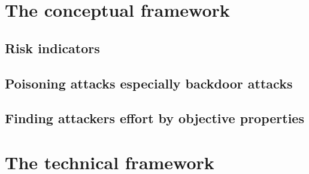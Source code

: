 \section{The conceptual framework}
\label{sec:conFrame}

\subsection{Risk indicators}
\label{sec:risk_indicators}

\subsection{Poisoning attacks especially backdoor attacks}

\subsection{Finding attackers effort by objective properties}

\newpage

\section{The technical framework}
\label{sec:techFrame}
